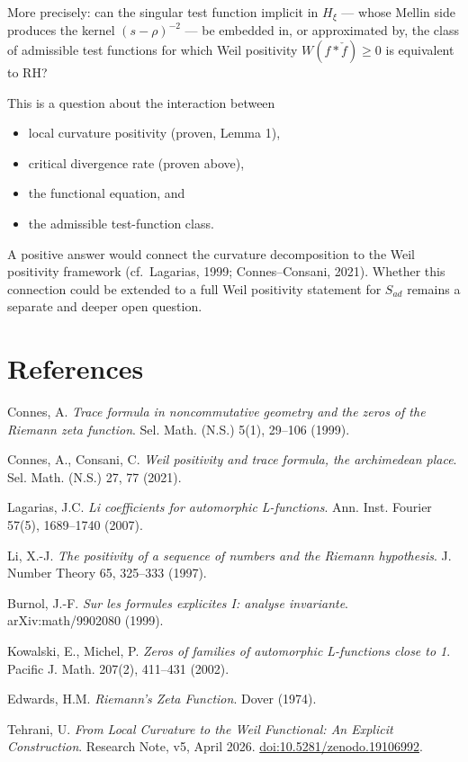 \documentclass[11pt]{article}
\begin{document}
More precisely: can the singular test function implicit in $H_{\xi}$ --- whose Mellin side produces the kernel $(s-\rho)^{-2}$ --- be embedded in, or approximated by, the class of admissible test functions for which Weil positivity $W(f*\check f)\ge 0$ is equivalent to RH?

This is a question about the interaction between
\begin{itemize}[leftmargin=2em]
\item local curvature positivity (proven, Lemma 1),
\item critical divergence rate (proven above),
\item the functional equation, and
\item the admissible test-function class.
\end{itemize}
A positive answer would connect the curvature
decomposition to the Weil positivity framework
(cf.\ Lagarias, 1999; Connes--Consani, 2021).
Whether this connection could be extended to
a full Weil positivity statement for $S_{ad}$
remains a separate and deeper open question.

\section*{References}
\begin{enumerate}[label={[\arabic*]},leftmargin=2em]
\item Connes, A. \emph{Trace formula in noncommutative geometry and the zeros of the Riemann zeta function}. Sel. Math. (N.S.) 5(1), 29--106 (1999).
\item Connes, A., Consani, C. \emph{Weil positivity and trace formula, the archimedean place}. Sel. Math. (N.S.) 27, 77 (2021).
\item Lagarias, J.C. \emph{Li coefficients for automorphic L-functions}. Ann. Inst. Fourier 57(5), 1689--1740 (2007).
\item Li, X.-J. \emph{The positivity of a sequence of numbers and the Riemann hypothesis}. J. Number Theory 65, 325--333 (1997).
\item Burnol, J.-F. \emph{Sur les formules explicites I: analyse invariante}. arXiv:math/9902080 (1999).
\item Kowalski, E., Michel, P. \emph{Zeros of families of automorphic L-functions close to 1}. Pacific J. Math. 207(2), 411--431 (2002).
\item Edwards, H.M. \emph{Riemann's Zeta Function}. Dover (1974).
\item Tehrani, U. \emph{From Local Curvature to the Weil Functional: An Explicit Construction}. Research Note, v5, April 2026.
\href{https://doi.org/10.5281/zenodo.19106992}{doi:10.5281/zenodo.19106992}.
\end{enumerate}
\end{document}
